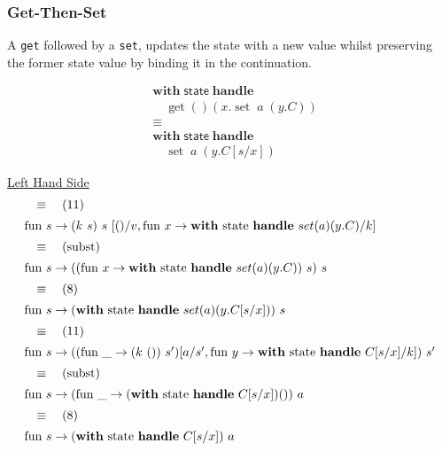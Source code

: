 \documentclass[logo,bsc,singlespacing,parskip]{infthesis}
\begin{document}
\subsubsection*{Get-Then-Set}
A \lstinline{get} followed by a \lstinline{set}, updates the state with a new value whilst preserving the former state value by binding it in the continuation. 


\[
\begin{aligned}
    &\mathsf{\textbf{with}} \; \mathsf{state} \; \mathsf{\textbf{handle}} \\
    &\quad \operatorname{get}() \left( x. \operatorname{set} \; a \; (y. C) \right) \\
    &\equiv \\
    &\mathsf{\textbf{with}} \; \mathsf{state} \; \mathsf{\textbf{handle}} \\
    &\quad \operatorname{set} \; a \; (y. C[s/x])
\end{aligned}
\]

\underline{Left Hand Side}
\[ 
\begin{array}{l}
\quad\equiv\quad (11) \\[5pt]
\text{fun } s \rightarrow (k\ s)\ s\ [()/v, \text{fun } x \rightarrow \text{\textbf{with} state \textbf{handle} } set(a)(y.C)/k] \\[5pt]
\quad\equiv\quad (\text{subst}) \\[5pt]
\text{fun } s \rightarrow ((\text{fun } x \rightarrow \text{\textbf{with} state \textbf{handle} } set(a)(y.C))\ s)\ s \\[5pt]
\quad\equiv\quad (8) \\[5pt]
\text{fun } s \rightarrow (\text{\textbf{with} state \textbf{handle} } set(a)(y.C[s/x]))\ s \\[5pt]
\quad\equiv\quad (11) \\[5pt]
\text{fun } s \rightarrow ((\text{fun } \_ \rightarrow (k\ ())\ s')[a/s', \text{fun } y \rightarrow \text{\textbf{with} state \textbf{handle} } C[s/x]/k])\ s' \\[5pt]
\quad\equiv\quad (\text{subst}) \\[5pt]
\text{fun } s \rightarrow (\text{fun } \_ \rightarrow (\text{\textbf{with} state \textbf{handle} } C[s/x]) ())\ a \\[5pt]
\quad\equiv\quad (8) \\[5pt]
\text{fun } s \rightarrow (\text{\textbf{with} state \textbf{handle} } C[s/x])\ a
\end{array}
\]
\end{document}

